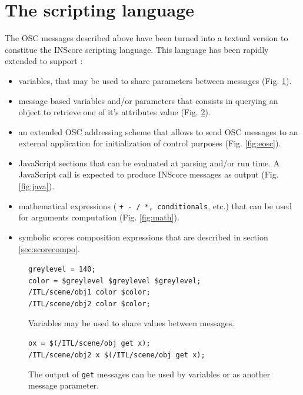\documentclass[11pt,a4paper]{article}
\newcommand{\OSC}[1]	{{\fontsize{10pt}{10pt} \selectfont\texttt{#1}}}
\newcommand{\sample}[1]	{\vspace{-0.2em}\begin{center}\colorbox{mygrey}{\begin{minipage}[t]{0.98\columnwidth} {\small \texttt{#1}}\end{minipage}}\end{center}}
\begin{document}
\section{The scripting language}
The OSC messages described above have been turned into a textual version to constitue the INScore scripting language. This language has been rapidly extended to support :
\begin{itemize}
\item variables, that may be used to share parameters between messages (Fig. \ref{fig:var}).
\item message based variables and/or parameters that consists in querying an object to retrieve one of it's attributes value (Fig. \ref{fig:msgvar}).
\item an extended OSC addressing scheme that allows to send OSC messages to an external application for initialization of control purposes (Fig. \ref{fig:eosc}).
\item JavaScript sections that can be evaluated at parsing and/or run time. A JavaScript call is expected to produce INScore messages as output (Fig. \ref{fig:java}).
\item mathematical expressions (\OSC{+ - / *, conditionals}, etc.) that can be used for arguments computation (Fig. \ref{fig:math}).
\item symbolic scores composition expressions that are described in section \ref{sec:scorecompo}. 
\end{itemize}

\begin{figure}[ht]
\begin{center}
\sample{greylevel = 140;\\
color = \$greylevel \$greylevel \$greylevel; \\
/ITL/scene/obj1 color \$color; \\
/ITL/scene/obj2 color \$color;
}
\caption{Variables may be used to share values between messages.}
\label{fig:var}
\end{center}
\end{figure}

\begin{figure}[ht]
\begin{center}
\sample{ox = \$(/ITL/scene/obj get x);\\
/ITL/scene/obj2 x \$(/ITL/scene/obj get x);
}
\caption{The output of \OSC{get} messages can be used by variables or as another message parameter.}
\label{fig:msgvar}
\end{center}
\end{figure}
\end{document}
